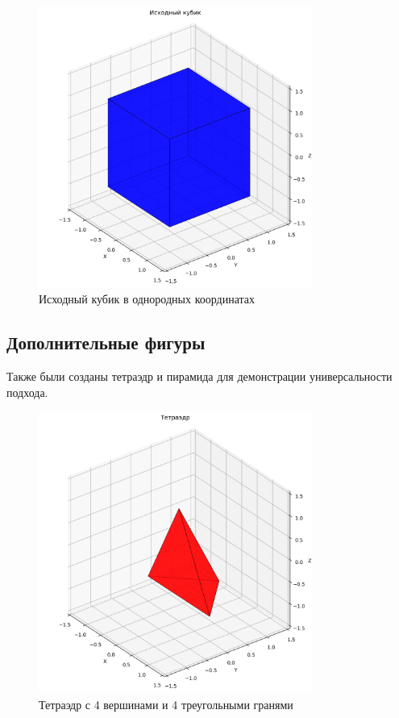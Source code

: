 \begin{figure}[H]
\centering
\includegraphics[width=0.8\textwidth]{images/task1/original_cube.png}
\caption{Исходный кубик в однородных координатах}
\end{figure}

\subsection*{Дополнительные фигуры}
Также были созданы тетраэдр и пирамида для демонстрации универсальности подхода.

\begin{figure}[H]
\centering
\includegraphics[width=0.8\textwidth]{images/task1/tetrahedron.png}
\caption{Тетраэдр с 4 вершинами и 4 треугольными гранями}
\end{figure}

